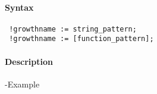 


	\paragraph{Syntax}
 
 \begin{verbatim}
 !growthname := string_pattern;
 !growthname := [function_pattern];
 \end{verbatim}
 
 \paragraph{Description}
 
 -Example


